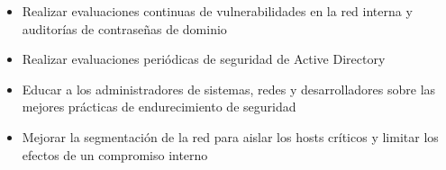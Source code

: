 \begin{itemize}
\item Realizar evaluaciones continuas de vulnerabilidades en la red interna y auditorías de contraseñas de dominio
\item Realizar evaluaciones periódicas de seguridad de Active Directory
\item Educar a los administradores de sistemas, redes y desarrolladores sobre las mejores prácticas de endurecimiento de seguridad
\item Mejorar la segmentación de la red para aislar los hosts críticos y limitar los efectos de un compromiso interno
\end{itemize}
